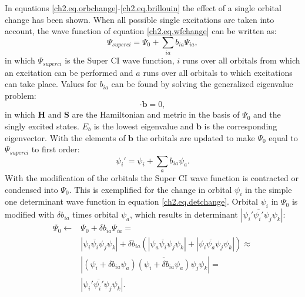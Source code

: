 In equations \ref{ch2.eq.orbchange}-\ref{ch2.eq.brillouin} the effect of a single orbital change has been shown. When all possible single excitations are taken into account, the wave function of equation \ref{ch2.eq.wfchange} can be written as:
\begin{equation}
\Psi_{superci} = \Psi_0 + \sum_{ia} b_{ia} \Psi_{ia},
\label{ch2.eq.superci}
\end{equation}
in which $\Psi_{superci}$ is the Super CI wave function, $i$ runs over all orbitals from which an excitation can be performed and $a$ runs over all orbitals to which excitations can take place. Values for $b_{ia}$ can be found by solving the generalized eigenvalue problem:
\begin{equation}
[\mathbf{H}-E_b\mathbf{S}] \cdot \mathbf{b} = 0,
\label{ch2.eq.geig}
\end{equation}
in which $\mathbf{H}$ and $\mathbf{S}$ are the Hamiltonian and metric in the basis of $\Psi_0$ and the singly excited states. $E_b$ is the lowest eigenvalue and $\mathbf{b}$ is the corresponding eigenvector. With the elements of $\mathbf{b}$ the orbitals are updated to make $\Psi_0$ equal to $\Psi_{superci}$ to first order:
\begin{equation}
\psi_i' = \psi_i + \sum_{a} b_{ia} \psi_a.
\label{ch2.eq.orbupd}
\end{equation}
With the modification of the orbitals the Super CI wave function is contracted or condensed into $\Psi_0$. This is exemplified for the change in orbital $\psi_i$ in the simple one determinant wave function in equation \ref{ch2.eq.detchange}. Orbital $\psi_i$ in $\Psi_0$ is modified with $\delta b_{ia}$ times orbital $\psi_a$, which results in determinant $|\psi_i'\overline{\psi_i'}\psi_j\psi_k |$:
\begin{equation}
\begin{split}
\Psi_{0} \leftarrow & \Psi_{0} + \delta b_{ia} \Psi_{ia} = \\
&|\psi_i\overline{\psi_i}\psi_j\psi_k| + \delta b_{ia}(|\psi_a\overline{\psi_i}\psi_j\psi_k| + |\psi_i\overline{\psi_a}\psi_j\psi_k|) \approx \\
&|(\psi_i + \delta b_{ia}\psi_a)\overline{(\psi_i + \delta b_{ia}\psi_a)}\psi_j\psi_k| = \\
&|\psi_i'\overline{\psi_i'}\psi_j\psi_k |.\\
\end{split}
\label{ch2.eq.condense}
\end{equation}

